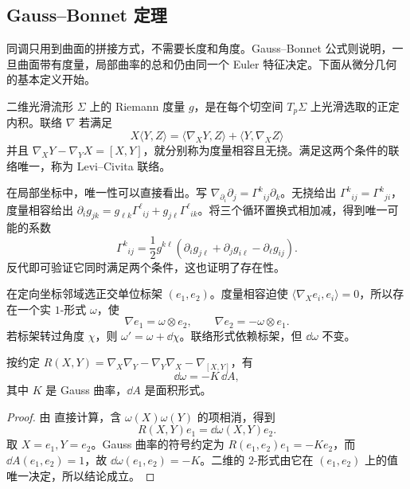 \subsection{Gauss--Bonnet 定理}

同调只用到曲面的拼接方式，不需要长度和角度。Gauss--Bonnet 公式则说明，一旦曲面带有度量，局部曲率的总和仍由同一个 Euler 特征决定。下面从微分几何的基本定义开始。

\begin{definition}
二维光滑流形 \(\Sigma\) 上的 Riemann 度量 \(g\)，是在每个切空间 \(T_p\Sigma\) 上光滑选取的正定内积。联络 \(\nabla\) 若满足
\[
X\langle Y,Z\rangle
=\langle\nabla_XY,Z\rangle+\langle Y,\nabla_XZ\rangle
\]
并且
\(\nabla_XY-\nabla_YX=[X,Y]\)，就分别称为度量相容且无挠。满足这两个条件的联络唯一，称为 Levi--Civita 联络。
\end{definition}

在局部坐标中，唯一性可以直接看出。写
\(\nabla_{\partial_i}\partial_j=\Gamma^k{}_{ij}\partial_k\)。无挠给出
\(\Gamma^k{}_{ij}=\Gamma^k{}_{ji}\)，度量相容给出
\(\partial_i g_{jk}=g_{\ell k}\Gamma^\ell{}_{ij}+g_{j\ell}\Gamma^\ell{}_{ik}\)。将三个循环置换式相加减，得到唯一可能的系数
\[
\Gamma^k{}_{ij}
=\frac12g^{k\ell}
(\partial_i g_{j\ell}+\partial_j g_{i\ell}-\partial_\ell g_{ij}).
\]
反代即可验证它同时满足两个条件，这也证明了存在性。

在定向坐标邻域选正交单位标架 \((e_1,e_2)\)。度量相容迫使
\(\langle\nabla_Xe_i,e_i\rangle=0\)，所以存在一个实 \(1\)-形式 \(\omega\)，使
\begin{equation}
\nabla e_1=\omega\otimes e_2,
\qquad
\nabla e_2=-\omega\otimes e_1.
\label{eq:surface-connection-one-form}
\end{equation}
若标架转过角度 \(\chi\)，则
\(\omega'=\omega+\dd\chi\)。联络形式依赖标架，但
\(\dd\omega\) 不变。

\begin{proposition}[二维曲率形式]
按约定
\(R(X,Y)=\nabla_X\nabla_Y-\nabla_Y\nabla_X-\nabla_{[X,Y]}\)，有
\begin{equation}
\dd\omega=-K\,\dd A,
\label{eq:surface-cartan-curvature}
\end{equation}
其中 \(K\) 是 Gauss 曲率，\(\dd A\) 是面积形式。
\end{proposition}

\begin{proof}
由  直接计算，含
\(\omega(X)\omega(Y)\) 的项相消，得到
\[
R(X,Y)e_1=\dd\omega(X,Y)e_2.
\]
取 \(X=e_1,Y=e_2\)。Gauss 曲率的符号约定为
\(R(e_1,e_2)e_1=-Ke_2\)，而
\(\dd A(e_1,e_2)=1\)，故
\(\dd\omega(e_1,e_2)=-K\)。二维的 \(2\)-形式由它在
\((e_1,e_2)\) 上的值唯一决定，所以结论成立。
\end{proof}

